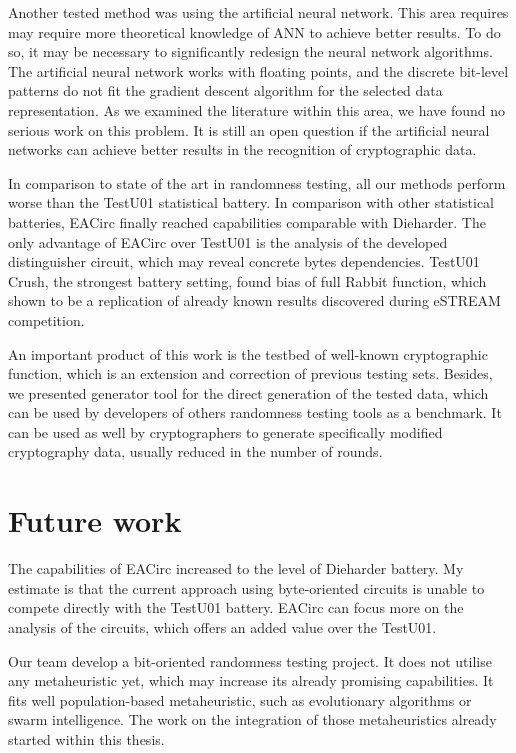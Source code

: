 \documentclass[
  print, %
  Table,   %
  nolof,     %
  nolot,     %
  11pt, %
  oneside  %
]{fithesis3}
\begin{document}
Another tested method was using the artificial neural network. This area requires may require more theoretical knowledge of ANN to achieve better results. To do so, it may be necessary to significantly redesign the neural network algorithms. The artificial neural network works with floating points, and the discrete bit-level patterns do not fit the gradient descent algorithm for the selected data representation. As we examined the literature within this area, we have found no serious work on this problem. It is still an open question if the artificial neural networks can achieve better results in the recognition of cryptographic data.

In comparison to state of the art in randomness testing, all our methods perform worse than the TestU01 statistical battery. In comparison with other statistical batteries, EACirc finally reached capabilities comparable with Dieharder. The only advantage of EACirc over TestU01 is the analysis of the developed distinguisher circuit, which may reveal concrete bytes dependencies. TestU01 Crush, the strongest battery setting, found bias of full Rabbit function, which shown to be a replication of already known results discovered during eSTREAM competition.

An important product of this work is the testbed of well-known cryptographic function, which is an extension and correction of previous testing sets. Besides, we presented generator tool for the direct generation of the tested data, which can be used by developers of others randomness testing tools as a benchmark. It can be used as well by cryptographers to generate specifically modified cryptography data, usually reduced in the number of rounds.

\section{Future work}
\label{sec:conclusion-future}

The capabilities of EACirc increased to the level of Dieharder battery. My estimate is that the current approach using byte-oriented circuits is unable to compete directly with the TestU01 battery. EACirc can focus more on the analysis of the circuits, which offers an added value over the TestU01.

Our team develop a bit-oriented randomness testing project. It does not utilise any metaheuristic yet, which may increase its already promising capabilities. It fits well population-based metaheuristic, such as evolutionary algorithms or swarm intelligence. The work on the integration of those metaheuristics already started within this thesis.
\end{document}
